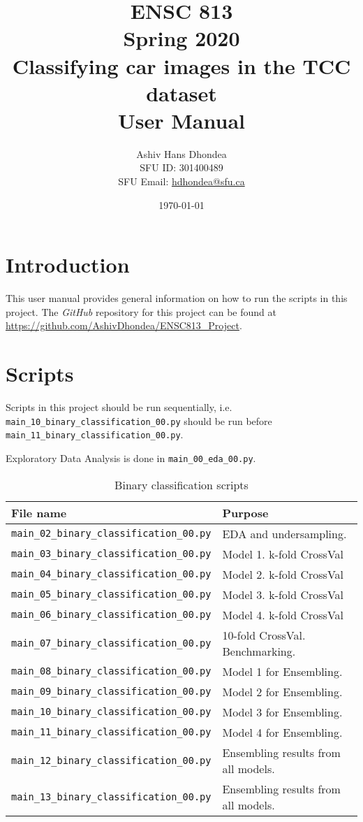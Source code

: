 \documentclass[12pt]{article}
\title{ENSC 813 \\ Spring 2020 \\ Classifying car images in the TCC dataset \\ User Manual}
\author{Ashiv Hans Dhondea\\SFU ID: 301400489\\SFU Email: \href{mailto:hdhondea@sfu.ca}{hdhondea@sfu.ca} }
\date{\today}
\begin{document}
\maketitle
\vskip 5mm

\newpage

\section{Introduction} 
This user manual provides general information on how to run the scripts in this project. The \textit{GitHub} repository for this project can be found at \url{https://github.com/AshivDhondea/ENSC813_Project}.

\section{Scripts}
Scripts in this project should be run sequentially, i.e. \verb|main_10_binary_classification_00.py| should be run before \verb|main_11_binary_classification_00.py|.

Exploratory Data Analysis is done in \verb|main_00_eda_00.py|.

\begin{table}[H]
	\caption{Binary classification scripts} \label{table:scripts}
	\centering
	\begin{adjustbox}{max width=\textwidth}
	\begin{tabular}{| l | l | }
		\hline
		\textbf{File name} & \textbf{Purpose} \\
		\hline \hline
		\verb|main_02_binary_classification_00.py| & EDA and undersampling. \\ \hline 
		\verb|main_03_binary_classification_00.py| & Model 1. k-fold CrossVal \\ \hline
		\verb|main_04_binary_classification_00.py| & Model 2. k-fold CrossVal \\ \hline 
		\verb|main_05_binary_classification_00.py| & Model 3. k-fold CrossVal \\ \hline 
		\verb|main_06_binary_classification_00.py| & Model 4. k-fold CrossVal \\ \hline 
		\verb|main_07_binary_classification_00.py| & 10-fold CrossVal. Benchmarking. \\ \hline 
		\verb|main_08_binary_classification_00.py| & Model 1 for Ensembling. \\ \hline 
		\verb|main_09_binary_classification_00.py| & Model 2 for Ensembling. \\ \hline 
		\verb|main_10_binary_classification_00.py| & Model 3 for Ensembling.\\ \hline 
		\verb|main_11_binary_classification_00.py| & Model 4 for Ensembling.\\ \hline 
		\verb|main_12_binary_classification_00.py| & Ensembling results from all models.\\ \hline 
		\verb|main_13_binary_classification_00.py| & Ensembling results from all models. \\

		\hline
	\end{tabular}%
\end{adjustbox}
\end{table}
\end{document}
